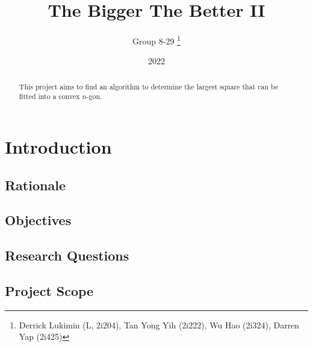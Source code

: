 \documentclass[11pt]{article}
\title{The Bigger The Better II}
\author{Group 8-29 \thanks{Derrick Lukimin (L, 2i204), Tan Yong Yih (2i222), Wu Hao (2i324), Darren Yap (2i425)}}
\date{2022}
\begin{document}
\onehalfspacing
\maketitle
\tableofcontents

\begin{abstract}
  This project aims to find an algorithm to determine
  the largest square that can be fitted into a convex
  $n$-gon.
\end{abstract}

\section{Introduction}
\subsection{Rationale}
\subsection{Objectives}
\subsection{Research Questions}
\subsection{Project Scope}
\end{document}

